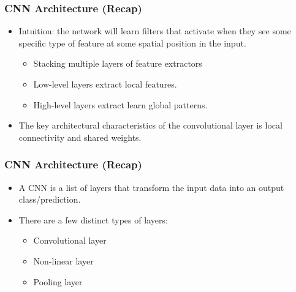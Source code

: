 \begin{frame}[fragile] \frametitle{CNN Architecture (Recap)}

\begin{itemize}
\item Intuition: the network will learn filters that activate when they see some specific type of feature at some spatial position in the input.
\begin{itemize}
\item Stacking multiple layers of feature extractors
\item Low-level layers extract local features.
\item High-level layers extract learn global patterns.
\end{itemize}
\item The key architectural characteristics of the convolutional layer is local connectivity and shared weights.
\end{itemize}
\end{frame}


\begin{frame}[fragile] \frametitle{CNN Architecture (Recap)}
\begin{itemize}
\item A CNN is a list of layers that transform the input data into an output class/prediction.
\item There are a few distinct types of layers:
\begin{itemize}
\item Convolutional layer
\item Non-linear layer
\item Pooling layer
\end{itemize}
\end{itemize}
\end{frame}


